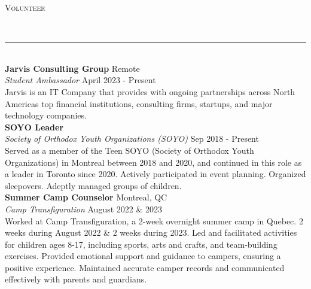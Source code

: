 \documentclass[a4paper]{article}
\newcommand{\lineunder}{
	\vspace*{-8pt} \\
	\hspace*{-18pt} \renewcommand{\hrulefill}{\rule{1.025\textwidth}{1.5pt}} \hrulefill \\
}
\newcommand{\header} [1] {
	{\hspace*{-18pt}\vspace*{6pt} \textsc{#1}}
	\vspace*{-6pt} 
	\lineunder
}
\begin{document}
	\header{Volunteer}
	\textbf{Jarvis Consulting Group} \hfill Remote\\
	\textit{Student Ambassador} \hfill April 2023 - Present\\
	Jarvis is an IT Company that provides with ongoing partnerships across North America\textquotesingle{}s top financial institutions, consulting firms, startups, and major technology companies. \\
	\vspace*{2mm}
	\textbf{SOYO Leader} \hfill\\
	\textit{Society of Orthodox Youth Organizations (SOYO)} \hfill Sep 2018 - Present\\
	Served as a member of the Teen SOYO (Society of Orthodox Youth Organizations) in Montreal between 2018 and 2020, and continued in this role as a leader in Toronto since 2020. Actively participated in event planning. Organized sleepovers. Adeptly managed groups of children. \\
	\vspace*{2mm}
	\textbf{Summer Camp Counselor} \hfill Montreal, QC\\
	\textit{Camp Transfiguration} \hfill August 2022 \& 2023\\
	Worked at Camp Transfiguration, a 2-week overnight summer camp in Quebec. 2 weeks during August 2022 \& 2 weeks during 2023. Led and facilitated activities for children ages 8-17, including sports, arts and crafts, and team-building exercises. Provided emotional support and guidance to campers, ensuring a positive experience. Maintained accurate camper records and communicated effectively with parents and guardians.\\
	
	
\end{document}
